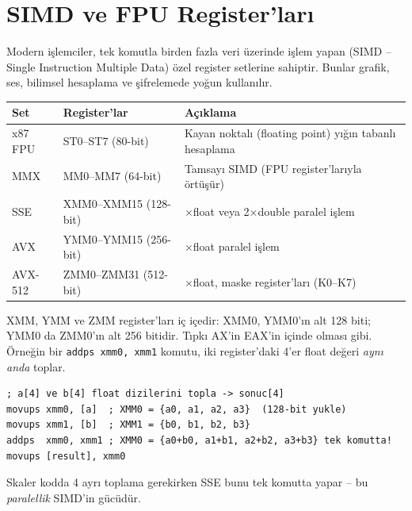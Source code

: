 \documentclass[11pt,a4paper]{article}
\newcommand{\kod}[1]{\texttt{\color{koyuGri}#1}}
\begin{document}
\section{SIMD ve FPU Register'ları}

Modern işlemciler, tek komutla birden fazla veri üzerinde işlem yapan
(SIMD -- Single Instruction Multiple Data) özel register setlerine sahiptir.
Bunlar grafik, ses, bilimsel hesaplama ve şifrelemede yoğun kullanılır.

\begin{center}
\begin{tabularx}{\textwidth}{@{}l l >{\raggedright\arraybackslash}X@{}}
\toprule
\rowcolor{anaMavi}\color{white}\textbf{Set} & \color{white}\textbf{Register'lar} & \color{white}\textbf{Açıklama} \\
\midrule
x87 FPU & ST0--ST7 (80-bit) & Kayan noktalı (floating point) yığın tabanlı hesaplama \\
\rowcolor{acikGri} MMX & MM0--MM7 (64-bit) & Tamsayı SIMD (FPU register'larıyla örtüşür) \\
SSE & XMM0--XMM15 (128-bit) & 4$\times$float veya 2$\times$double paralel işlem \\
\rowcolor{acikGri} AVX & YMM0--YMM15 (256-bit) & 8$\times$float paralel işlem \\
AVX-512 & ZMM0--ZMM31 (512-bit) & 16$\times$float, maske register'ları (K0--K7) \\
\bottomrule
\end{tabularx}
\end{center}

\begin{bilgikutu}
XMM, YMM ve ZMM register'ları iç içedir: XMM0, YMM0'ın alt 128 biti; YMM0 da
ZMM0'ın alt 256 bitidir. Tıpkı AX'in EAX'in içinde olması gibi. Örneğin bir
\kod{addps xmm0, xmm1} komutu, iki register'daki 4'er float değeri
\emph{aynı anda} toplar.
\end{bilgikutu}

\begin{ornekkutu}
\begin{lstlisting}
; a[4] ve b[4] float dizilerini topla -> sonuc[4]
movups xmm0, [a]  ; XMM0 = {a0, a1, a2, a3}  (128-bit yukle)
movups xmm1, [b]  ; XMM1 = {b0, b1, b2, b3}
addps  xmm0, xmm1 ; XMM0 = {a0+b0, a1+b1, a2+b2, a3+b3} tek komutta!
movups [result], xmm0
\end{lstlisting}
Skaler kodda 4 ayrı toplama gerekirken SSE bunu tek komutta yapar -- bu
\emph{paralellik} SIMD'in gücüdür.
\end{ornekkutu}
\end{document}
